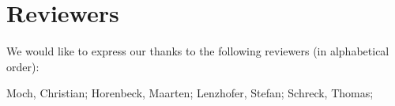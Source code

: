 \section{Reviewers}

We would like to express our thanks to the following reviewers (in alphabetical order):

Moch, Christian; 
Horenbeck, Maarten;
Lenzhofer, Stefan;
Schreck, Thomas; 

